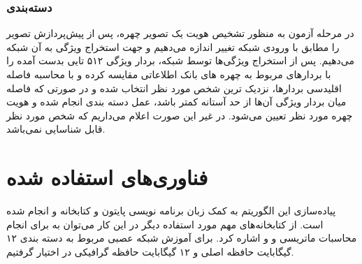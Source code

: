 \subsubsection{دسته‌بندی}
در مرحله آزمون به منظور تشخیص هویت یک تصویر چهره، پس از پیش‌پردازش تصویر را مطابق با ورودی شبکه تغییر اندازه می‌دهیم و جهت استخراج ویژگی‌ به آن شبکه می‌دهیم. پس از استخراج ویژگی‌ها توسط شبکه، بردار ویژگی ۵۱۲ تایی بدست آمده را با بردارهای مربوط به چهره های بانک اطلاعاتی مقایسه کرده و با محاسبه فاصله اقلیدسی بردارها، نزدیک ترین شخص مورد نظر انتخاب شده و در صورتی که فاصله میان بردار ویژگی آن‌ها از حد آستانه کمتر باشد، عمل دسته بندی انجام شده و هویت چهره مورد نظر تعیین می‌شود. در غیر این صورت اعلام می‌داریم که شخص مورد نظر قابل شناسایی نمی‌باشد.

\section{فناوری‌های استفاده شده}
پیاده‌سازی این الگوریتم به کمک زبان برنامه‌ نویسی پایتون و کتابخانه  و  انجام شده است. از کتابخانه‌های مهم مورد استفاده دیگر در این کار می‌‌توان به  برای انجام محاسبات ماتریسی و  و  اشاره کرد. برای آموزش شبکه عصبی مربوط به دسته بندی ۱۲ گیگابایت حافظه اصلی و ۱۲ گیگابایت حافظه گرافیکی در اختیار گرفتیم.
